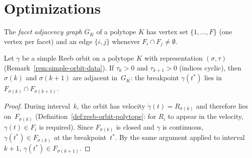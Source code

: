 
\section{Optimizations}\label{sec:optimizations}

\begin{definition}\label{def:adjacency-graph}
The \emph{facet adjacency graph} $G_K$ of a polytope $K$ has
vertex set $\{1, \ldots, F\}$ (one vertex per facet) and an edge
$\{i, j\}$ whenever $F_i \cap F_j \neq \emptyset$.
\end{definition}

\begin{lemma}\label{lem:adjacency-constraint}
Let $\gamma$ be a simple Reeb orbit on a polytope $K$ with
representation $(\sigma, \tau)$
(Remark~\ref{rem:simple-orbit-data}).
If $\tau_k > 0$ and $\tau_{k+1} > 0$ (indices cyclic), then
$\sigma(k)$ and $\sigma(k+1)$ are adjacent in~$G_K$:
the breakpoint $\gamma(t^*)$ lies in
$F_{\sigma(k)} \cap F_{\sigma(k+1)}$.
\end{lemma}

\begin{proof}
During interval~$k$, the orbit has velocity
$\dot{\gamma}(t) = R_{\sigma(k)}$ and therefore lies on~$F_{\sigma(k)}$
(Definition~\ref{def:reeb-orbit-polytope}: for $R_i$ to appear
in the velocity, $\gamma(t) \in F_i$ is required).
Since $F_{\sigma(k)}$ is closed and $\gamma$ is continuous,
$\gamma(t^*) \in F_{\sigma(k)}$ at the breakpoint~$t^*$.
By the same argument applied to interval~$k{+}1$,
$\gamma(t^*) \in F_{\sigma(k+1)}$.
\end{proof}

